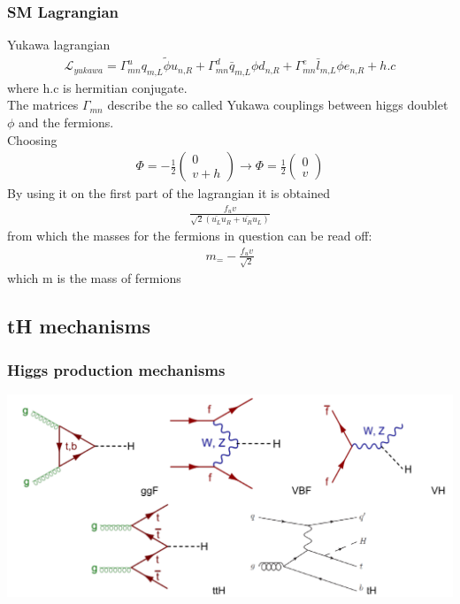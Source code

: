 \documentclass[11pt]{beamer}
\begin{document}
\begin{frame}
\frametitle{SM Lagrangian}
Yukawa lagrangian
\begin{align}
\mathcal{L}_{yukawa}=\Gamma^u_{mn}q_{m\text{,}L} \tilde{\phi} u_{n\text{,}R}+\Gamma^d_{mn}\bar{q}_{m\text{,}L} \phi d_{n\text{,}R}+\Gamma^e_{mn}\bar{l}_{m\text{,}L} \phi e_{n\text{,}R}+h.c
\end{align}
\scriptsize{where h.c is hermitian conjugate.\\
The matrices $\Gamma_{mn}$ describe the so called Yukawa couplings between higgs doublet $\phi$ and the fermions.\\
Choosing}
\begin{align*}
\Phi=-\frac{1}{2}\left(\begin{array}{c}
0 \\
v+h
\end{array} \right) \rightarrow  \Phi=\frac{1}{2}\left(\begin{array}{c}
0 \\
v
\end{array} \right)
\end{align*}
\scriptsize{
By using it on the first part of 
the lagrangian it is obtained } 
\begin{align*}
	\frac{f_u v}{\sqrt{2}(\bar{u_L}u_R+\bar{u_R}u_L)}
\end{align*}
\scriptsize{
from which the masses for the fermions in question can be read off:}
\begin{align*}
m_=-\frac{f_uv}{\sqrt{2}}
\end{align*}
which m is the mass of fermions 
\end{frame}

\begin{frame}
\section{tH mechanisms}
\frametitle{Higgs production mechanisms}
\begin{center}
\includegraphics[scale=0.4]{figures/pg.png}
\end{center}
\end{frame}
\end{document}
